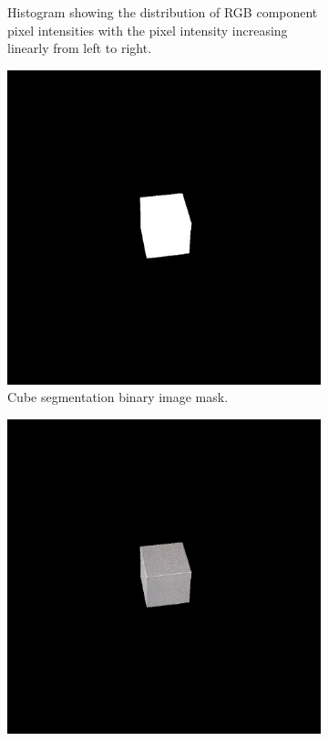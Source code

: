 \begin{figure}[H]
\begin{subfigure}[b]{0.4\textwidth}
         \caption{Histogram showing the distribution of RGB component pixel intensities with the pixel intensity increasing linearly from left to right.}
         \label{fig:original-cube-close-hist}
    \end{subfigure}
    \begin{subfigure}[b]{0.35\textwidth}
        \includegraphics[width=\textwidth]{figures/202105/original-cube-mask.jpg}
        \caption{Cube segmentation binary image mask.}
        \label{fig:original-cube-mask}
   \end{subfigure}
   \begin{subfigure}[b]{0.35\textwidth}
        \includegraphics[width=\textwidth]{figures/202105/original-cube-segment.jpg}

\end{subfigure}
\end{figure}
